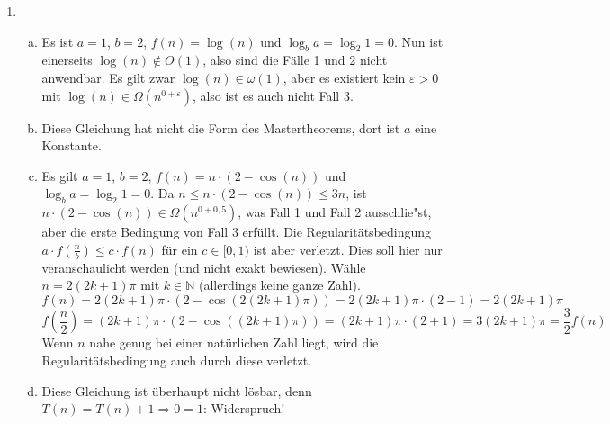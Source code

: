 \documentclass{scrartcl}
\begin{document}
\begin{enumerate}[(1)]
\item \begin{enumerate}[(a)]
\item Es ist $a=1$, $b=2$, $f(n)=\log(n)$ und $\log_b a=\log_2 1=0$. Nun ist einerseits $\log(n)\notin O(1)$, also sind die F\"alle 1 und 2 nicht anwendbar. Es gilt zwar $\log(n)\in\omega(1)$, aber es existiert kein $\varepsilon >0$ mit $\log(n)\in\Omega(n^{0+\varepsilon})$, also ist es auch nicht Fall 3.
\item Diese Gleichung hat nicht die Form des Mastertheorems, dort ist $a$ eine Konstante.
\item Es gilt $a=1$, $b=2$, $f(n)=n\cdot (2-\cos(n))$ und $\log_b a=\log_2 1=0$. Da $n\leq n\cdot (2-\cos(n))\leq 3n$, ist $n\cdot (2-\cos(n))\in \Omega(n^{0+0,5})$, was Fall 1 und Fall 2 ausschlie"st, aber die erste Bedingung von Fall 3 erf\"ullt. Die Regularit\"atsbedingung $a\cdot f(\frac{n}{b})\leq c\cdot f(n)$ f\"ur ein $c\in[0,1)$ ist aber verletzt. Dies soll hier nur veranschaulicht werden (und nicht exakt bewiesen). W\"ahle $n=2(2k+1)\pi$ mit $k\in\mathbb{N}$ (allerdings keine ganze Zahl).
$$f(n)=2(2k+1)\pi\cdot(2-\cos(2(2k+1)\pi))=2(2k+1)\pi\cdot(2-1)=2(2k+1)\pi$$
$$f(\frac{n}{2})=(2k+1)\pi\cdot(2-\cos((2k+1)\pi))=(2k+1)\pi\cdot(2+1)=3(2k+1)\pi=\frac{3}{2}f(n)$$
Wenn $n$ nahe genug bei einer nat\"urlichen Zahl liegt, wird die Regularit\"atsbedingung auch durch diese verletzt.
\item Diese Gleichung ist \"uberhaupt nicht l\"osbar, denn $T(n)=T(n)+1\Rightarrow 0=1$: Widerspruch!
\end{enumerate}


\end{enumerate}
\end{document}
